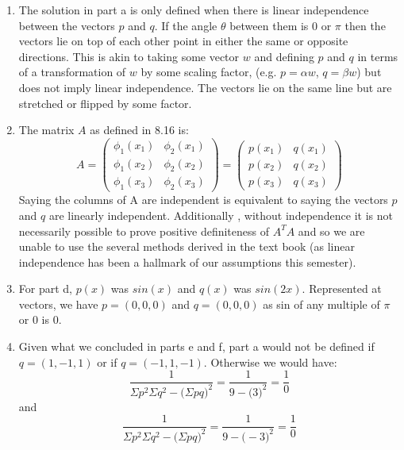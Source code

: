\documentclass[11pt,a4paper]{article}
\begin{document}
\begin{itemize}
\begin{enumerate} [label={\alph*)}]
						\item The solution in part a is only defined when there is linear independence between the vectors $p$ and $q$. If the angle $\theta$ between them is $0$ or $\pi$ then the vectors lie on top of each other point in either the same or opposite directions. This is akin to taking some vector $w$ and defining $p$ and $q$ in terms of a transformation of $w$ by some scaling factor, (e.g. $p = \alpha w$, $q = \beta w$) but does not imply linear independence. The vectors lie on the same line but are stretched or flipped by some factor.
						
						\item The matrix $A$ as defined in 8.16 is:
						$$ A = \begin{pmatrix}
							\phi_1(x_1) & \phi_2(x_1) \\
							\phi_1(x_2) & \phi_2(x_2) \\
							\phi_1(x_3) & \phi_2(x_3)
						\end{pmatrix} = 
						\begin{pmatrix}
							p(x_1) & q(x_1) \\
							p(x_2) & q(x_2) \\
							p(x_3) & q(x_3)
						\end{pmatrix}$$
						Saying the columns of A are independent is equivalent to saying the vectors $p$ and $q$ are linearly independent. Additionally , without independence it is not necessarily possible to prove positive definiteness of $A^TA$ and so we are unable to use the several methods derived in the text book (as linear independence has been a hallmark of our assumptions this semester).
						
						\item For part d, $p(x)$ was $sin(x)$ and $q(x)$ was $sin(2x)$. Represented at vectors, we have $p = (0,0,0)$ and $q = (0,0,0)$ as sin of any multiple of $\pi$ or 0 is 0.
						
						\item Given what we concluded in parts e and f, part a would not be defined if $q=(1,-1,1)$ or if $q=(-1,1,-1)$. Otherwise we would have:
						$$\frac{1}{\Sigma p^2\Sigma q^2 - \big(\Sigma pq \big)^2} = \frac{1}{9 - \big(3 \big)^2} = \frac{1}{0}$$
						and
						$$\frac{1}{\Sigma p^2\Sigma q^2 - \big(\Sigma pq \big)^2} = \frac{1}{9 - \big(-3 \big)^2} = \frac{1}{0}$$
				\end{enumerate}
		\end{itemize}	
\end{document}

